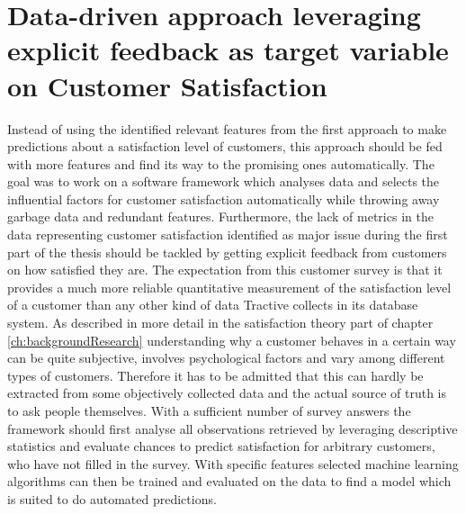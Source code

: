 \chapter{Data-driven approach leveraging explicit feedback as target variable on Customer Satisfaction}
\label{ch:dataDriven}
Instead of using the identified relevant features from the first approach to make predictions about a satisfaction level of customers, this approach should be fed with more features and find its way to the promising ones automatically. The goal was to work on a software framework which analyses data and selects the influential factors for customer satisfaction automatically while throwing away garbage data and redundant features. Furthermore, the lack of metrics in the data representing customer satisfaction identified as major issue during the first part of the thesis should be tackled by getting explicit feedback from customers on how satisfied they are. The expectation from this customer survey is that it provides a much more reliable quantitative measurement of the satisfaction level of a customer than any other kind of data Tractive collects in its database system. As described in more detail in the satisfaction theory part of chapter \ref{ch:backgroundResearch} understanding why a customer behaves in a certain way can be quite subjective, involves psychological factors and vary among different types of customers. Therefore it has to be admitted that this can hardly be extracted from some objectively collected data and the actual source of truth is to ask people themselves. With a sufficient number of survey answers the framework should first analyse all observations retrieved by leveraging descriptive statistics and evaluate chances to predict satisfaction for arbitrary customers, who have not filled in the survey. With specific features selected machine learning algorithms can then be trained and evaluated on the data to find a model which is suited to do automated predictions. 

